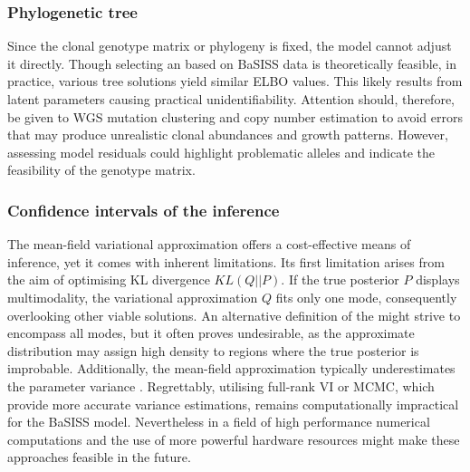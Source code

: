 \subsubsection*{Phylogenetic tree}
Since the clonal genotype matrix or phylogeny is fixed, the model cannot adjust it directly. Though selecting an  based on BaSISS data is theoretically feasible, in practice, various tree solutions yield similar \ac{ELBO} values. This likely results from latent parameters causing practical unidentifiability. Attention should, therefore, be given to \ac{WGS} mutation clustering and copy number estimation to avoid errors that may produce unrealistic clonal abundances and growth patterns. However, assessing model residuals could highlight problematic alleles and indicate the feasibility of the genotype matrix.

\subsubsection*{Confidence intervals of the inference}

The mean-field variational approximation offers a cost-effective means of inference, yet it comes with inherent limitations. Its first limitation arises from the aim of optimising KL divergence $KL(Q||P)$. If the true posterior $P$ displays multimodality, the variational approximation $Q$ fits only one mode, consequently overlooking other viable solutions. An alternative definition of the  might strive to encompass all modes, but it often proves undesirable, as the approximate distribution may assign high density to regions where the true posterior is improbable. Additionally, the mean-field approximation typically underestimates the parameter variance \parencite{Kucukelbir2016-gn}. Regrettably, utilising full-rank \ac{VI} or \ac{MCMC}, which provide more accurate variance estimations, remains computationally impractical for the \ac{BaSISS} model. Nevertheless  in a field of high performance numerical computations and the use of more powerful hardware resources might make these approaches feasible in the future. 

